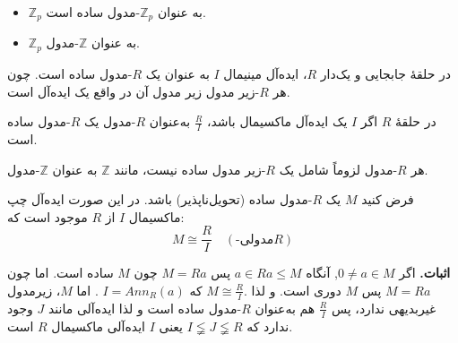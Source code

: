 \begin{frame}
    \begin{example}
        \begin{itemize}
            \item  $\mathbb{Z}_p$ به عنوان $\mathbb{Z}_p$-مدول ساده است.
            \item $\mathbb{Z}_p$ به عنوان $\mathbb{Z}$-مدول.

        \end{itemize}




    \end{example}


    \begin{example}
        در حلقهٔ
        جابجایی و یک‌دار
        $R$، ایده‌آل مینیمال $I$ به عنوان
        یک
        $R$-مدول
        ساده است.
        چون هر
        $R$-زیر مدول
        زیر مدول آن در واقع یک ایده‌آل است.

    \end{example}


    \begin{example}
        در حلقهٔ
        $R$
        اگر
        $I$
        یک ایده‌آل ماکسیمال باشد،
        \(\frac{R}{I}\)
        به‌عنوان
        $R$-مدول
        یک
        $R$-مدول ساده
        است.


    \end{example}

\end{frame}


\begin{frame}
    \begin{remark}
        هر $R$-مدول لزوماً شامل
        یک
        $R$-زیر مدول
        ساده نیست، مانند $\mathbb{Z}$ به عنوان $\mathbb{Z}$-مدول.

    \end{remark}


    \begin{theorem}
        فرض کنید $M$ یک $R$-مدول ساده  (تحویل‌ناپذیر) باشد. در این صورت ایده‌آل چپ ماکسیمال $I$ از $R$ موجود است که:
        \[
            M \cong \frac{R}{I} \quad (\text{-مدولی}R)
        \]
    \end{theorem}
    \textbf{اثبات.} اگر $0 \neq a \in M$,
    آنگاه
    \(a \in Ra \leqslant M\)
    پس
    $M = Ra$
    چون
    \(M\)
    ساده است. اما چون
    $M = Ra$
    پس
    \(M\)
    دوری است. و لذا
    \(M \cong \frac{R}{I}.\)
    که
    $I = Ann_R(a)$ .
    اما
    \(M\)،
    زیرمدول غیربدیهی ندارد، پس
    \(\frac{R}{I}\)
    هم به‌عنوان
    $R$-مدول
    ساده است و لذا ایده‌آلی مانند
    \(J\)
    وجود ندارد که
    \(I \lneqq J \lneqq R\)
    یعنی
    \(I\)
    ایده‌آلی ماکسیمال
    \(R\)
    است.

\end{frame}


